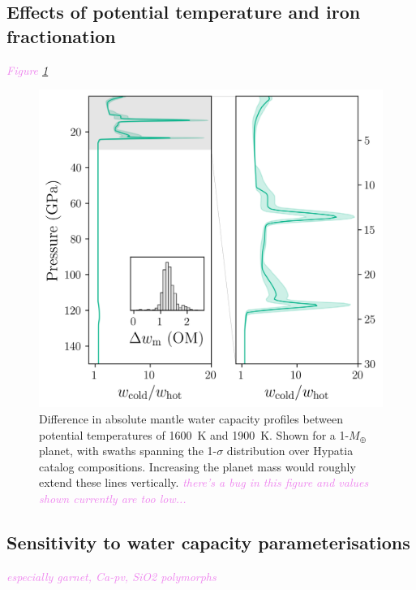 \documentclass[linenumbers]{aastex631}
\newcommand{\todo}[1]{\textit{\textcolor{violet}{{#1}}}}
\begin{document}
\subsection{Effects of potential temperature and iron fractionation}

\todo{Figure \ref{fig:sat_diff_T}}

\begin{figure}
    \centering
    \includegraphics[width=1\textwidth]{sat_T_diff.png}
    \caption{Difference in absolute mantle water capacity profiles between potential temperatures of 1600~K and 1900~K. Shown for a 1-$M_\oplus$ planet, with swaths spanning the 1-$\sigma$ distribution over Hypatia catalog compositions. Increasing the planet mass would roughly extend these lines vertically. \todo{there's a bug in this figure and values shown currently are too low...}}
    \label{fig:sat_diff_T}
\end{figure}

\subsection{Sensitivity to water capacity parameterisations}

\todo{especially garnet, Ca-pv, SiO2 polymorphs}

\end{document}
